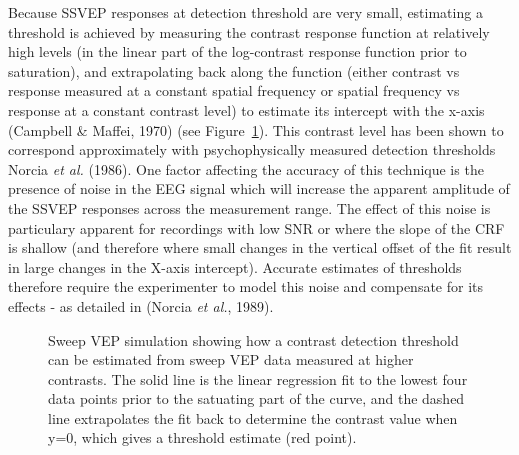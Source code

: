 \documentclass[
  letterpaper,
  DIV=11,
  numbers=noendperiod]{scrartcl}
\begin{document}
Because SSVEP responses at detection threshold are very small,
estimating a threshold is achieved by measuring the contrast response
function at relatively high levels (in the linear part of the
log-contrast response function prior to saturation), and extrapolating
back along the function (either contrast vs response measured at a
constant spatial frequency or spatial frequency vs response at a
constant contrast level) to estimate its intercept with the x-axis
(Campbell \& Maffei, 1970) (see Figure~\ref{fig-sweepvep}). This
contrast level has been shown to correspond approximately with
psychophysically measured detection thresholds Norcia \emph{et al.}
(1986). One factor affecting the accuracy of this technique is the
presence of noise in the EEG signal which will increase the apparent
amplitude of the SSVEP responses across the measurement range. The
effect of this noise is particulary apparent for recordings with low SNR
or where the slope of the CRF is shallow (and therefore where small
changes in the vertical offset of the fit result in large changes in the
X-axis intercept). Accurate estimates of thresholds therefore require
the experimenter to model this noise and compensate for its effects - as
detailed in (Norcia \emph{et al.}, 1989).

\begin{figure}


\caption{\label{fig-sweepvep}Sweep VEP simulation showing how a contrast
detection threshold can be estimated from sweep VEP data measured at
higher contrasts. The solid line is the linear regression fit to the
lowest four data points prior to the satuating part of the curve, and
the dashed line extrapolates the fit back to determine the contrast
value when y=0, which gives a threshold estimate (red point).}

\end{figure}%
\end{document}

